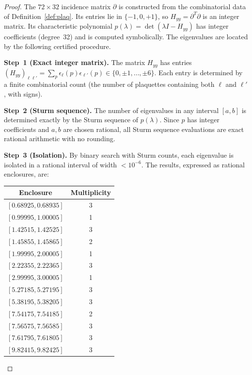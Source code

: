 \documentclass[11pt]{article}
\theoremstyle{definition}
\begin{document}
\begin{proof}
The $72\times 32$ incidence matrix $\partial$ is
constructed from the combinatorial data of Definition~\ref{def:plaq}.
Its entries lie in $\{-1,0,+1\}$, so $H_{yy}=\partial^T\partial$ is an
integer matrix.  Its characteristic polynomial $p(\lambda)=\det(\lambda I
-H_{yy})$ has integer coefficients (degree~32) and is computed
symbolically.  The eigenvalues are located by the following certified
procedure.

\medskip\noindent\textbf{Step~1 (Exact integer matrix).}
The matrix $H_{yy}$ has entries $(H_{yy})_{\ell\ell'}=\sum_p
\epsilon_\ell(p)\epsilon_{\ell'}(p)\in\{0,\pm 1,\ldots,\pm 6\}$.
Each entry is determined by a finite combinatorial count (the number of
plaquettes containing both $\ell$ and $\ell'$, with signs).

\medskip\noindent\textbf{Step~2 (Sturm sequence).}
The number of eigenvalues in any interval $[a,b]$ is determined exactly
by the Sturm sequence of $p(\lambda)$.  Since $p$ has integer
coefficients and $a,b$ are chosen rational, all Sturm sequence
evaluations are exact rational arithmetic with no rounding.

\medskip\noindent\textbf{Step~3 (Isolation).}
By binary search with Sturm counts, each eigenvalue is isolated in a
rational interval of width $<10^{-6}$.  The results, expressed as
rational enclosures, are:

\begin{center}
\begin{tabular}{cc}
\toprule
Enclosure & Multiplicity\\
\midrule
$[0.68925, 0.68935]$ & 3\\
$[0.99995, 1.00005]$ & 1\\
$[1.42515, 1.42525]$ & 3\\
$[1.45855, 1.45865]$ & 2\\
$[1.99995, 2.00005]$ & 1\\
$[2.22355, 2.22365]$ & 3\\
$[2.99995, 3.00005]$ & 1\\
$[5.27185, 5.27195]$ & 3\\
$[5.38195, 5.38205]$ & 3\\
$[7.54175, 7.54185]$ & 2\\
$[7.56575, 7.56585]$ & 3\\
$[7.61795, 7.61805]$ & 3\\
$[9.82415, 9.82425]$ & 3\\
\bottomrule
\end{tabular}
\end{center}


\end{proof}
\end{document}
